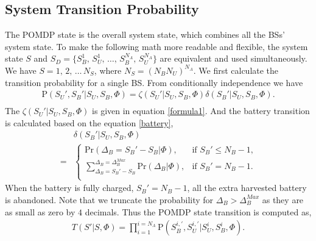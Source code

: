 \documentclass[conference]{IEEEtran}
\begin{document}
\subsection{System Transition Probability}
The POMDP state is the overall system state, which combines all the BSs' system state.
To make the following math more readable and flexible,
the system state \(S\) and \(S_D = \{S_B^1,\,S_U^1,\,\ldots,\,S_B^{N_A},\,S_U^{N_A}\}\)
are equivalent and used simultaneously.
We have \(S = 1,\,2,\, \ldots\,N_S\), where \(N_S = \left(N_BN_U\right)^{N_A}\).
We first calculate the transition probability for a single BS.
From conditionally independence we have
\begin{equation}
\begin{aligned}
	\mbox{P}\left(S_U',S_B'|S_U,S_B,\Phi\right) =
	\zeta\left(S_U'|S_U, S_B, \Phi\right) \delta\left(S_B'|S_U, S_B, \Phi\right).\\
\end{aligned}
\end{equation}
The \(\zeta\left(S_U'|S_U, S_B, \Phi\right)\) is given in equation \eqref{formula1}.
And the battery transition is calculated based on the equation \eqref{battery},
\begin{align}
	&\delta\left(S_B'|S_U, S_B, \Phi\right)\nonumber\\
	= &
	\begin{cases}
		\mbox{Pr}\left(\Delta_B = S_B' - S_B|\Phi \right), &\mbox{if $S_B' \le N_B - 1$,}\\
		\sum_{\Delta_B = S_B' - S_B}^{\Delta_B = \Delta_B^{Max}}\mbox{Pr}\left(\Delta_B|\Phi\right),
		&\mbox{if $S_B' = N_B - 1$.}\\
\end{cases}
\end{align}
When the battery is fully charged, \(S_B'=N_B - 1\), all the extra harvested battery is abandoned.
Note that we truncate the probability for \(\Delta_B >\Delta_B^{Max}\) as they are as small as zero by \(4\) decimals.
Thus the POMDP state transition is computed as,
\begin{align}\label{transition}
	T\left(S'|S,\Phi\right) = \prod_{i = 1}^{i = N_A}\mbox{P}\left(S_B^{i,'}, S_U^{i,'}|S_U^i, S_B^i, \Phi\right).
\end{align}
\end{document}
